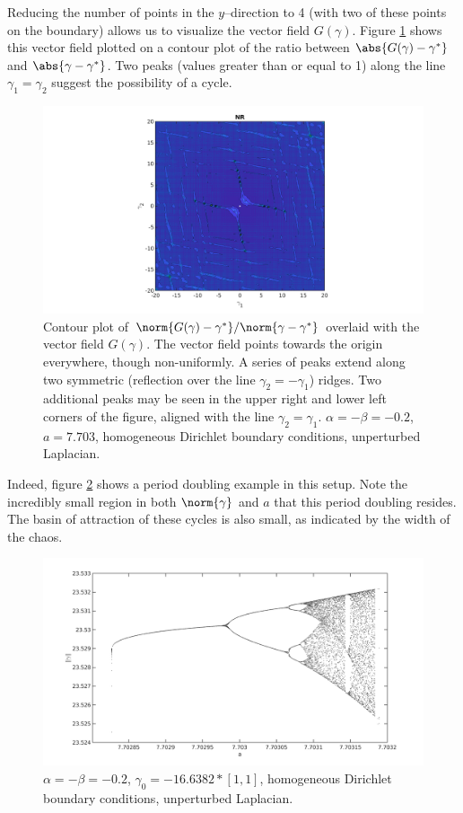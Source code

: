 \documentclass{article}
\begin{document}
Reducing the number of points in the $y$--direction to 4 (with two of these points on the boundary) allows us to visualize the vector field $G(\gamma)$.
Figure \ref{fig:exp18_01} shows this vector field plotted on a contour plot of the ratio between $\abs{G(\gamma)-\gamma^*}$ and $\abs{\gamma - \gamma^*}$.
Two peaks (values greater than or equal to 1) along the line $\gamma_1 = \gamma_2$ suggest the possibility of a cycle.

\begin{figure}
	\includegraphics[width=\textwidth]{exp18_01.png}
	\caption{Contour plot of $\norm{G(\gamma) - \gamma^*}/\norm{\gamma-\gamma^*}$ overlaid with the vector field $G(\gamma)$.
	The vector field points towards the origin everywhere, though non-uniformly.
	A series of peaks extend along two symmetric (reflection over the line $\gamma_2 = -\gamma_1$) ridges.
	Two additional peaks may be seen in the upper right and lower left corners of the figure, aligned with the line $\gamma_2 = \gamma_1$.
	$\alpha = -\beta = -0.2$, $a = 7.703$, homogeneous Dirichlet boundary conditions, unperturbed Laplacian.}
	\label{fig:exp18_01}
\end{figure}

Indeed, figure \ref{fig:exp15_07} shows a period doubling example in this setup.
Note the incredibly small region in both $\norm{\gamma}$ and $a$ that this period doubling resides.
The basin of attraction of these cycles is also small, as indicated by the width of the chaos.

\begin{figure}
	\includegraphics[width=\textwidth]{exp15_07.png}
	\caption{$\alpha=-\beta=-0.2$, $\gamma_0 = -16.6382 * [1,1]$, homogeneous Dirichlet boundary conditions, unperturbed Laplacian.}
	\label{fig:exp15_07}
\end{figure}
\end{document}
